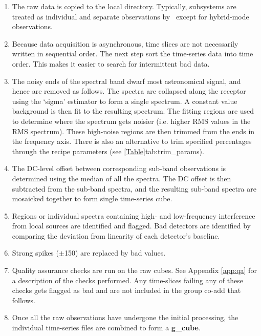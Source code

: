 \documentclass[11pt,oneside,chapters]{starlink}
\begin{document}
\begin{enumerate}[label=(\textbf{\arabic*})]

\item The raw data is copied to the local directory. Typically,
subsystems are treated as individual and separate observations by
\ORACDR\ except for hybrid-mode observations.

\item Because data acquisition is asynchronous, time slices are not
necessarily written in sequential order. The next step sort the
time-series data into time order. This makes it easier to search for
intermittent bad data.

\item The noisy ends of the spectral band dwarf most
astronomical signal, and hence are removed as follows.
The spectra are collapsed along the receptor using the `sigma'
estimator to form a single spectrum. A constant value background is
then fit to the resulting spectrum. The fitting regions are used to
determine where the spectrum gets noisier (i.e. higher RMS values in
the RMS spectrum). These high-noise regions are then trimmed from the
ends in the frequency axis.   There is also an alternative to trim
specified percentages through the  recipe parameters
(see \cref{Table}{tab:trim_params}{}).

\item The DC-level offset between corresponding sub-band observations
is determined using the median of all the spectra.  The DC offset is
then subtracted from the sub-band spectra, and the resulting sub-band
spectra are mosaicked together to form single time-series cube.

\item Regions or individual spectra containing high- and low-frequency
interference from local sources are identified and flagged.  Bad
detectors are identified by comparing the deviation from linearity of
each detector's baseline.

\item Strong spikes ($\pm$150) are replaced by bad values.

\item Quality assurance checks are run on the raw cubes. See Appendix
\ref{app:qa} for a description of the checks performed. Any
time-slices failing any of these checks gets flagged as bad and
are not included in the group co-add that follows.

\item Once all the raw observations have undergone the initial
processing, the individual time-series files are combined to form a
\textbf{g\_cube}.


\end{enumerate}
\end{document}
